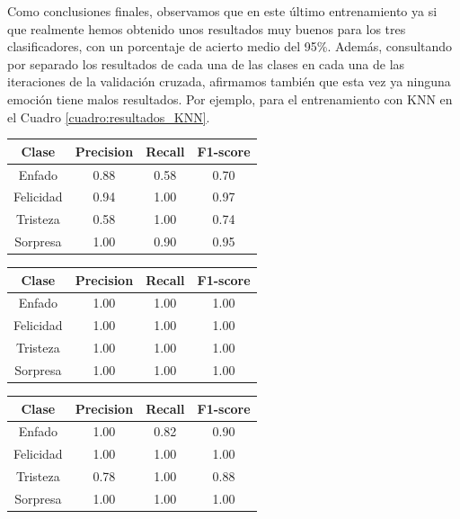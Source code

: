 Como conclusiones finales, observamos que en este último entrenamiento ya si que realmente hemos obtenido unos resultados muy buenos para los tres clasificadores, con un porcentaje de acierto medio del 95\%. Además, consultando por separado los resultados de cada una de las clases en cada una de las iteraciones de la validación cruzada, afirmamos también que esta vez ya ninguna emoción tiene malos resultados. Por ejemplo, para el entrenamiento con KNN en el Cuadro \ref{cuadro:resultados_KNN}.\\

\begin{table}
\begin{minipage}{0.48\linewidth}
\centering
\begin{adjustbox}{max width=\textwidth}
\begin{tabular}{|c|c|c|c|}
\hline
\textbf{Clase} & \textbf{Precision} & \textbf{Recall} & \textbf{F1-score}\\
\hline
     Enfado & 0.88 & 0.58 & 0.70\\
     Felicidad & 0.94 & 1.00 & 0.97\\
     Tristeza & 0.58 & 1.00 & 0.74\\
     Sorpresa & 1.00 & 0.90 & 0.95\\
\hline
\end{tabular}
\end{adjustbox}
\vspace{0.5cm}

\begin{adjustbox}{max width=\textwidth}
\begin{tabular}{|c|c|c|c|}
\hline
\textbf{Clase} & \textbf{Precision} & \textbf{Recall} & \textbf{F1-score}\\
\hline
     Enfado & 1.00 & 1.00 & 1.00\\
     Felicidad & 1.00 & 1.00 & 1.00\\
     Tristeza & 1.00 & 1.00 & 1.00\\
     Sorpresa & 1.00 & 1.00 & 1.00\\
\hline
\end{tabular}
\end{adjustbox}
\end{minipage}\hfill
\begin{minipage}{0.48\linewidth}
\centering
\begin{adjustbox}{max width=\textwidth}
\begin{tabular}{|c|c|c|c|}
\hline
\textbf{Clase} & \textbf{Precision} & \textbf{Recall} & \textbf{F1-score}\\
\hline
     Enfado & 1.00 & 0.82 & 0.90\\
     Felicidad & 1.00 & 1.00 & 1.00\\
     Tristeza & 0.78 & 1.00 & 0.88\\
     Sorpresa & 1.00 & 1.00 & 1.00\\
\hline
\end{tabular}
\end{adjustbox}
\vspace{0.5cm}


\end{minipage}
\end{table}
